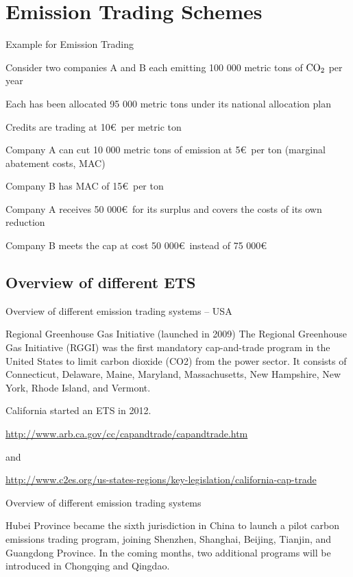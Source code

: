 \section{Emission Trading Schemes}

{Example for Emission Trading}


	Consider two companies A and B each emitting 100 000 metric tons of $\textnormal{CO}_2$ per year

	Each has been allocated 95 000 metric tons under its national allocation plan

	Credits are trading at 10\euro\ per metric ton

	Company A can cut 10 000 metric tons of emission at 5\euro\ per ton (marginal abatement costs, MAC)

	Company B has MAC of 15\euro\ per ton

	Company A receives 50 000\euro\ for its surplus and covers the costs of its own reduction

	Company B meets the cap at cost 50 000\euro\ instead of 75 000\euro


\subsection[Overview]{Overview of different ETS}

{Overview of different emission trading systems  -- USA}

  Regional Greenhouse Gas Initiative (launched in 2009)
        The Regional Greenhouse Gas Initiative (RGGI) was the first mandatory cap-and-trade program in the United States to limit carbon dioxide (CO2) from the power sector. It consists of Connecticut, Delaware, Maine, Maryland, Massachusetts, New Hampshire, New York, Rhode Island, and Vermont.

   California started an ETS in 2012.

   \url{http://www.arb.ca.gov/cc/capandtrade/capandtrade.htm}

  and

  \url{http://www.c2es.org/us-states-regions/key-legislation/california-cap-trade}


{Overview of different emission trading systems}

 Hubei Province became the sixth jurisdiction in China to launch a pilot carbon emissions trading program, joining Shenzhen, Shanghai, Beijing, Tianjin, and Guangdong Province. In the coming months, two additional programs will be introduced in Chongqing and Qingdao.

